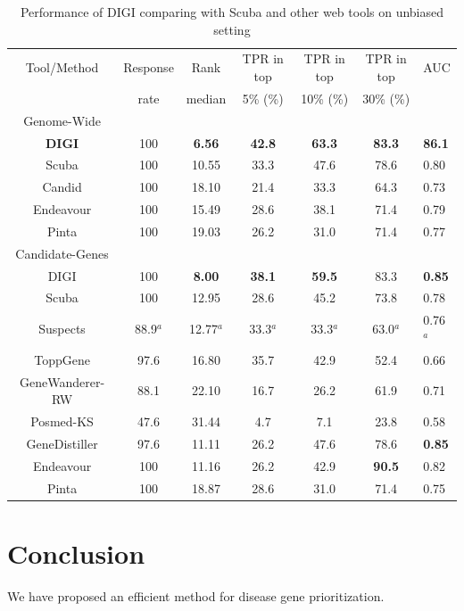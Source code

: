 \begin{table}
\caption{Performance of DIGI comparing with Scuba and other web tools on unbiased setting} 
\label{tab:2}
%
\begin{tabular*}{\textwidth}{@{\extracolsep{\fill}}ccccccl}
\hline
  Tool/Method & Response & Rank & TPR in top & TPR in top & TPR in top & AUC\\
              & rate     & median & 5\% (\%) & 10\% (\%) & 30\% (\%) &\\
\hline
Genome-Wide \\
  \textbf{DIGI} & 100 & \textbf{6.56} & \textbf{42.8} & \textbf{63.3} & \textbf{83.3} & \textbf{86.1} \\
  Scuba & 100 & 10.55  &  33.3 & 47.6 & 78.6 & 0.80 \\
  Candid & 100 &  18.10 & 21.4 & 33.3 & 64.3 & 0.73 \\
  Endeavour & 100 &  15.49 & 28.6 & 38.1 & 71.4 & 0.79 \\  
  Pinta & 100 & 19.03 & 26.2 & 31.0 & 71.4 & 0.77 \\
  \hline
  Candidate-Genes \\
  DIGI & 100 &  \textbf{8.00} & \textbf{38.1} & \textbf{59.5} & 83.3 & \textbf{0.85} \\
  Scuba & 100 &  12.95  &  28.6 & 45.2 & 73.8 & 0.78 \\
  Suspects & 88.9$^a$ &  12.77$^a$ & 33.3$^a$ & 33.3$^a$ & 63.0$^a$ & 0.76$^a$ \\
  ToppGene & 97.6 &  16.80 & 35.7 & 42.9 & 52.4 & 0.66 \\  
  GeneWanderer-RW & 88.1 &  22.10 & 16.7 & 26.2 & 61.9 & 0.71 \\
  Posmed-KS & 47.6 &  31.44 & 4.7 & 7.1 & 23.8 & 0.58 \\
  GeneDistiller & 97.6 &  11.11 & 26.2 & 47.6 & 78.6 & \textbf{0.85}\\  
  Endeavour & 100 &  11.16 & 26.2 & 42.9 & \textbf{90.5} & 0.82 \\
  Pinta & 100 & 18.87 & 28.6 & 31.0 & 71.4 & 0.75 \\  
\hline
\end{tabular*}
\end{table}

\section{Conclusion}
We have proposed an efficient method for disease gene prioritization.

